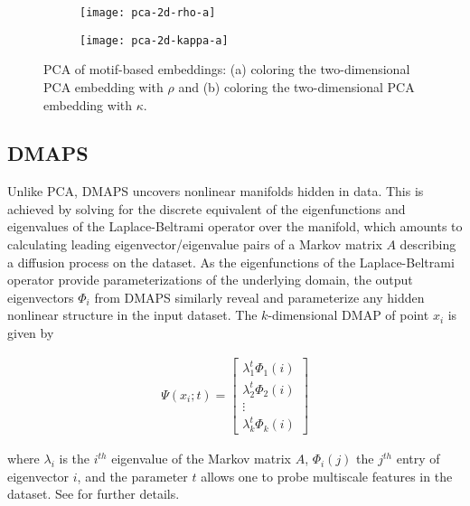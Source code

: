 \documentclass[epjST, final]{svjour}
\begin{document}
\begin{onehalfspace}
\begin{figure}[h!]
  \vspace{-5mm}
  \centering
  \begin{subfigure}{0.49\textwidth}
    \centering
    \texttt{[image: pca-2d-rho-a]}
    \subcaption{\label{fig:pca-rho}}
  \end{subfigure} %
  \begin{subfigure}{0.49\textwidth}
    \centering
    \texttt{[image: pca-2d-kappa-a]}
    \subcaption{\label{fig:pca-kappa}}
  \end{subfigure}%
  \caption{PCA of motif-based embeddings: (a) coloring the
    two-dimensional PCA embedding with $\rho$ and (b) coloring the
    two-dimensional PCA embedding with $\kappa$. \label{fig:pca}}
\end{figure}

\subsection{DMAPS}

Unlike PCA, DMAPS uncovers nonlinear manifolds hidden in data. This is
achieved by solving for the discrete equivalent of the eigenfunctions
and eigenvalues of the Laplace-Beltrami operator over the manifold,
which amounts to calculating leading eigenvector/eigenvalue pairs of a
Markov matrix $A$ describing a diffusion process on the dataset. As the
eigenfunctions of the Laplace-Beltrami operator provide
parameterizations of the underlying domain, the output eigenvectors $\Phi_i$
from DMAPS similarly reveal and parameterize any hidden nonlinear
structure in the input dataset. The $k$-dimensional DMAP of point
$x_i$ is given by

\begin{align*}
  \Psi(x_i; t) = \begin{bmatrix} \lambda_1^t \Phi_1(i) \\ \lambda_2^t
    \Phi_2(i) \\ \vdots \\
    \lambda_k^t \Phi_k(i) \end{bmatrix}
\end{align*}

where $\lambda_i$ is the $i^{th}$ eigenvalue of the Markov matrix $A$,
$\Phi_i(j)$ the $j^{th}$ entry of eigenvector $i$, and the parameter
$t$ allows one to probe multiscale features in the dataset. See
\cite{coifman_diffusion_2006,nadler_diffusion_2006} for
further details. \\


\end{onehalfspace}
\end{document}
